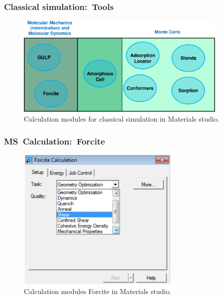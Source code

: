 \frame
{
	\frametitle{\textrm{Classical simulation:~Tools}}
\begin{figure}[h!]
\centering
\vspace*{-0.10in}
\includegraphics[height=1.91in,width=4.00in,viewport=0 0 1494 711,clip]{Figures/MS-Classical_simulation-tools.png}
\caption{\tiny \textrm{Calculation modules for classical simulation in Materials studio.}}%
\label{MS-Classical_simulation-}
\end{figure}
}

\frame
{
	\frametitle{\textrm{MS~Calculation:~Forcite}}
\begin{figure}[h!]
\centering
\vspace*{-0.18in}
\includegraphics[height=2.70in,width=3.08in,viewport=0 0 845 741,clip]{Figures/MS-Caluculator_Forcite-parameter.png}
\caption{\tiny \textrm{Calculation modules Forcite in Materials studio.}}%
\label{MS-Forcite_Plus}
\end{figure}
}

